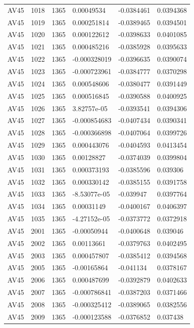 \begin{longtable}{llllll}
AV45 & 1018 & 1365 & 0.00049534 & -0.0384461 & 0.0394368 \\
AV45 & 1019 & 1365 & 0.000251814 & -0.0389465 & 0.0394501 \\
AV45 & 1020 & 1365 & 0.000122612 & -0.0398633 & 0.0401085 \\
AV45 & 1021 & 1365 & 0.000485216 & -0.0385928 & 0.0395633 \\
AV45 & 1022 & 1365 & -0.000328019 & -0.0396635 & 0.0390074 \\
AV45 & 1023 & 1365 & -0.000723961 & -0.0384777 & 0.0370298 \\
AV45 & 1024 & 1365 & 0.000548606 & -0.0380477 & 0.0391449 \\
AV45 & 1025 & 1365 & 0.000516845 & -0.0390588 & 0.0400925 \\
AV45 & 1026 & 1365 & 3.82757e-05 & -0.0393541 & 0.0394306 \\
AV45 & 1027 & 1365 & -0.000854683 & -0.0407434 & 0.0390341 \\
AV45 & 1028 & 1365 & -0.000366898 & -0.0407064 & 0.0399726 \\
AV45 & 1029 & 1365 & 0.000443076 & -0.0404593 & 0.0413454 \\
AV45 & 1030 & 1365 & 0.00128827 & -0.0374039 & 0.0399804 \\
AV45 & 1031 & 1365 & 0.000373193 & -0.0385596 & 0.039306 \\
AV45 & 1032 & 1365 & 0.000330142 & -0.0385155 & 0.0391758 \\
AV45 & 1033 & 1365 & -8.53077e-05 & -0.039947 & 0.0397764 \\
AV45 & 1034 & 1365 & 0.00031149 & -0.0400167 & 0.0406397 \\
AV45 & 1035 & 1365 & -4.27152e-05 & -0.0373772 & 0.0372918 \\
AV45 & 2001 & 1365 & -0.00050944 & -0.0400648 & 0.039046 \\
AV45 & 2002 & 1365 & 0.00113661 & -0.0379763 & 0.0402495 \\
AV45 & 2003 & 1365 & 0.000457807 & -0.0385412 & 0.0394568 \\
AV45 & 2005 & 1365 & -0.00165864 & -0.041134 & 0.0378167 \\
AV45 & 2006 & 1365 & 0.000487699 & -0.0392879 & 0.0402633 \\
AV45 & 2007 & 1365 & -0.000786841 & -0.0387203 & 0.0371466 \\
AV45 & 2008 & 1365 & -0.000325412 & -0.0389065 & 0.0382556 \\
AV45 & 2009 & 1365 & -0.000123588 & -0.0376852 & 0.037438 \\

\end{longtable}
